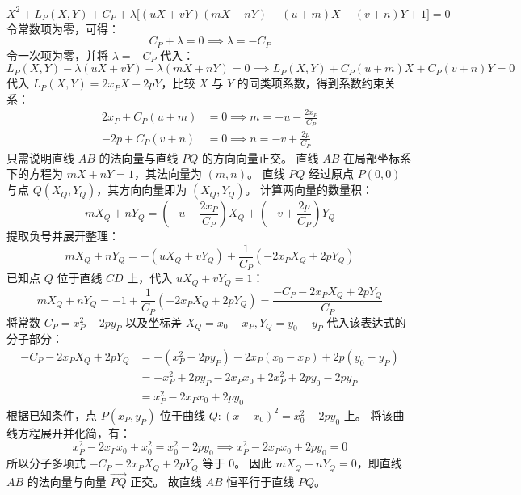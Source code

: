 \begin{solution}
$$ X^2 + L_P(X, Y) + C_P + \lambda \big[ (uX + vY)(mX + nY) - (u+m)X - (v+n)Y + 1 \big] = 0 $$
令常数项为零，可得：
$$ C_P + \lambda = 0 \implies \lambda = -C_P $$
令一次项为零，并将 $\lambda = -C_P$ 代入：
$$ L_P(X, Y) - \lambda(uX + vY) - \lambda(mX + nY) = 0 \implies L_P(X, Y) + C_P(u + m)X + C_P(v + n)Y = 0 $$
代入 $L_P(X, Y) = 2x_P X - 2p Y$，比较 $X$ 与 $Y$ 的同类项系数，得到系数约束关系：
\begin{align*}
2x_P + C_P(u + m) &= 0 \implies m = -u - \frac{2x_P}{C_P} \\
-2p + C_P(v + n) &= 0 \implies n = -v + \frac{2p}{C_P}
\end{align*}
只需说明直线 $AB$ 的法向量与直线 $PQ$ 的方向向量正交。
直线 $AB$ 在局部坐标系下的方程为 $mX + nY = 1$，其法向量为 $(m, n)$。
直线 $PQ$ 经过原点 $P(0,0)$ 与点 $Q(X_Q, Y_Q)$，其方向向量即为 $(X_Q, Y_Q)$。
计算两向量的数量积：
$$ m X_Q + n Y_Q = \left(-u - \frac{2x_P}{C_P}\right) X_Q + \left(-v + \frac{2p}{C_P}\right) Y_Q $$
提取负号并展开整理：
$$ m X_Q + n Y_Q = -(u X_Q + v Y_Q) + \frac{1}{C_P}(-2x_P X_Q + 2p Y_Q) $$
已知点 $Q$ 位于直线 $CD$ 上，代入 $u X_Q + v Y_Q = 1$：
$$ m X_Q + n Y_Q = -1 + \frac{1}{C_P}(-2x_P X_Q + 2p Y_Q) = \frac{-C_P - 2x_P X_Q + 2p Y_Q}{C_P} $$
将常数 $C_P = x_P^2 - 2py_P$ 以及坐标差 $X_Q = x_0 - x_P, Y_Q = y_0 - y_P$ 代入该表达式的分子部分：
\begin{align*}
-C_P - 2x_P X_Q + 2p Y_Q &= -(x_P^2 - 2py_P) - 2x_P(x_0 - x_P) + 2p(y_0 - y_P) \\
&= -x_P^2 + 2py_P - 2x_P x_0 + 2x_P^2 + 2py_0 - 2py_P \\
&= x_P^2 - 2x_P x_0 + 2py_0
\end{align*}
根据已知条件，点 $P(x_P, y_P)$ 位于曲线 $Q: (x - x_0)^2 = x_0^2 - 2py_0$ 上。
将该曲线方程展开并化简，有：
$$ x_P^2 - 2x_P x_0 + x_0^2 = x_0^2 - 2py_0 \implies x_P^2 - 2x_P x_0 + 2py_0 = 0 $$
所以分子多项式 $-C_P - 2x_P X_Q + 2p Y_Q$ 等于 $0$。
因此 $m X_Q + n Y_Q = 0$，即直线 $AB$ 的法向量与向量 $\overrightarrow{PQ}$ 正交。
故直线 $AB$ 恒平行于直线 $PQ$。

\end{solution}

